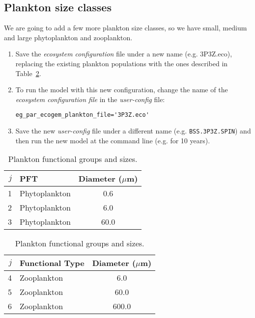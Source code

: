 \documentclass[11pt,fleqn]{book} %
\begin{document}

\subsection{Plankton size classes} We are going to add a few more plankton size classes, so we have small, medium and large phytoplankton and zooplankton.

\begin{enumerate}[noitemsep]
\vspace{1mm}
\item Save the \textit{ecosystem configuration} file under a new name (e.g. \textsf{\footnotesize 3P3Z.eco}), replacing the existing plankton populations with the ones described in Table~\ref{planktonconfig1}.
\vspace{1mm}
\item  To run the model with this new configuration, change the name of the \textit{ecosystem configuration file} in the \textit{user-config} file:
\vspace{-1mm}\begin{verbatim}
eg_par_ecogem_plankton_file='3P3Z.eco'
\end{verbatim}\vspace{-1mm}
\vspace{1mm}
\item Save the new \textit{user-config} file under a different name (e.g. \texttt{BSS.3P3Z.SPIN}) and then run the new model at the command line (e.g. for 10 years).
\end{enumerate}
\vspace{2mm}

\vspace{-4mm}
\begin{table}[htp!]
\begin{center}
\caption{Plankton functional groups and sizes.}
\begin{tabular}{rlc}
\hline
$j$     & PFT                   & \multicolumn{1}{r}{Diameter ($\mu$m)}  \\
\hline
1       & Phytoplankton         & 0.6  \\
2       & Phytoplankton         & 6.0  \\
3       & Phytoplankton         & 60.0  \\
\hline
\end{tabular}
\begin{tabular}{rlc}
\hline
$j$     & Functional Type       & \multicolumn{1}{r}{Diameter ($\mu$m)}  \\
\hline
4       & Zooplankton           & 6.0  \\
5       & Zooplankton           & 60.0  \\
6       & Zooplankton           & 600.0  \\
\hline
\end{tabular}
\label{planktonconfig1}
\end{center}
\end{table}
\vspace{-4mm}
\end{document}
